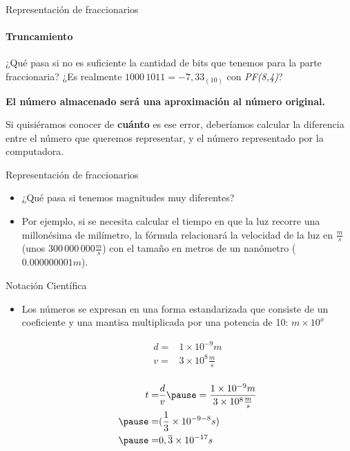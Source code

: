 \documentclass[11pt,a4paper,spanish]{beamer}
\begin{document}
\begin{frame}{Representación de fraccionarios}
\framesubtitle{Truncamiento}

    ¿Qué pasa si no es suficiente la cantidad de bits que tenemos para la
    parte fraccionaria?  ¿Es realmente \(1000\,1011 = -7,33_{(10)}\) con
    \emph{PF(8,4)}?
    \pause

    \textbf{El número almacenado será una aproximación al número original.}

    \pause

    Si quisiéramos conocer de \textbf{cuánto} es ese error, deberíamos
    calcular la diferencia entre el número que queremos representar, y el
    número representado por la computadora.

\end{frame}

\begin{frame}{Representación de fraccionarios}
\begin{itemize}
    \item ¿Qué pasa si tenemos magnitudes muy diferentes?
    \pause
    \item \small Por ejemplo, si se necesita calcular el tiempo en que la luz
        recorre una millonésima de milímetro, la fórmula relacionará la
        velocidad de la luz en \(\frac{m}{s}\) (unos \(300\,000\,000
        \frac{m}{s}\)) con el tamaño en metros de un nanómetro (\(0.000000001
        m\)).
\end{itemize}
\end{frame}

\begin{frame}{Notación Científica}
\begin{itemize}
    \item Los números se expresan en una forma estandarizada que consiste de
        un coeficiente y una mantisa multiplicada por una potencia de 10: \(m
        \times 10^{x}\)
\pause

\begin{equation*}
\begin{aligned}
    d =& 1\times{}10^{-9}m\\
    v =& 3\times{}10^8\frac{m}{s}\\
\end{aligned}
\end{equation*}
\pause

\begin{equation*}
\begin{aligned}
    t =& \frac{d}{v} \pause =
    \frac{1\times 10^{-9}m}{3\times 10^{8}\frac{m}{s}}\\
    \pause
      =& (\frac{1}{3} \times 10^{-9-8}s)\\
    \pause
      =& 0,\overline{3}\times10^{-17}s\\
\end{aligned}
\end{equation*}

\end{itemize}
\end{frame}
\end{document}
